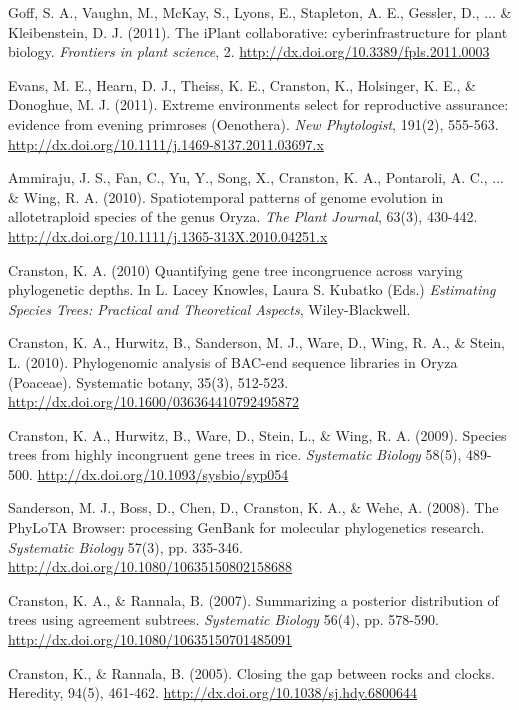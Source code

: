 \documentclass[10pt]{article}
\begin{document}
Goff, S. A., Vaughn, M., McKay, S., Lyons, E., Stapleton, A. E., Gessler, D., ... \& Kleibenstein, D. J. (2011). The iPlant collaborative: cyberinfrastructure for plant biology. \textit{Frontiers in plant science}, 2. \url{http://dx.doi.org/10.3389/fpls.2011.0003} 

Evans, M. E., Hearn, D. J., Theiss, K. E., Cranston, K., Holsinger, K. E., \& Donoghue, M. J. (2011). Extreme environments select for reproductive assurance: evidence from evening primroses (Oenothera). \textit{New Phytologist}, 191(2), 555-563. \url{http://dx.doi.org/10.1111/j.1469-8137.2011.03697.x} 

Ammiraju, J. S., Fan, C., Yu, Y., Song, X., Cranston, K. A., Pontaroli, A. C., ... \& Wing, R. A. (2010). Spatiotemporal patterns of genome evolution in allotetraploid species of the genus Oryza. \textit{The Plant Journal}, 63(3), 430-442. \url{http://dx.doi.org/10.1111/j.1365-313X.2010.04251.x} 

Cranston, K. A. (2010) Quantifying gene tree incongruence across varying phylogenetic depths. In L. Lacey Knowles, Laura S. Kubatko (Eds.) \textit{Estimating Species Trees: Practical and Theoretical Aspects}, Wiley-Blackwell.

Cranston, K. A., Hurwitz, B., Sanderson, M. J., Ware, D., Wing, R. A., \& Stein, L. (2010). Phylogenomic analysis of BAC-end sequence libraries in Oryza (Poaceae). Systematic botany, 35(3), 512-523. \url{http://dx.doi.org/10.1600/036364410792495872} 

Cranston, K. A., Hurwitz, B., Ware, D., Stein, L., \& Wing, R. A. (2009). Species trees from highly incongruent gene trees in rice.  \textit{Systematic Biology} 58(5), 489-500. \url{http://dx.doi.org/10.1093/sysbio/syp054} 

Sanderson, M. J., Boss, D., Chen, D., Cranston, K. A., \& Wehe, A. (2008). The PhyLoTA Browser: processing GenBank for molecular phylogenetics research. \textit{Systematic Biology} 57(3), pp. 335-346. \url{http://dx.doi.org/10.1080/10635150802158688} 

Cranston, K. A., \& Rannala, B. (2007). Summarizing a posterior distribution of trees using agreement subtrees. \textit{Systematic Biology} 56(4), pp. 578-590. \\
\url{http://dx.doi.org/10.1080/10635150701485091} 

Cranston, K., \& Rannala, B. (2005). Closing the gap between rocks and clocks. Heredity, 94(5), 461-462. \url{http://dx.doi.org/10.1038/sj.hdy.6800644}

\end{document}
